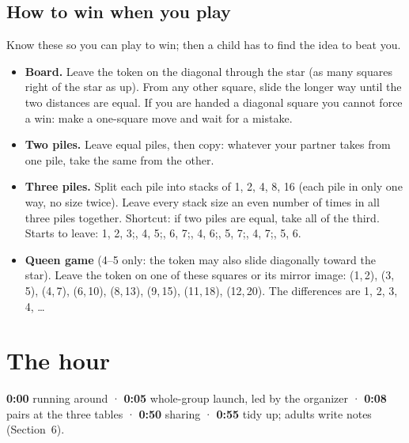 \documentclass[10pt]{article}
\begin{document}
\subsection{How to win when you play}
Know these so you can play to win; then a child has to find the idea to beat you.
\begin{itemize}
\item \textbf{Board.} Leave the token on the diagonal through the star (as many squares right of the star as up). From any other square, slide the longer way until the two distances are equal. If you are handed a diagonal square you cannot force a win: make a one-square move and wait for a mistake.
\item \textbf{Two piles.} Leave equal piles, then copy: whatever your partner takes from one pile, take the same from the other.
\item \textbf{Three piles.} Split each pile into stacks of 1, 2, 4, 8, 16 (each pile in only one way, no size twice). Leave every stack size an even number of times in all three piles together. Shortcut: if two piles are equal, take all of the third. Starts to leave: 1, 2, 3;, 4, 5;, 6, 7;, 4, 6;, 5, 7;, 4, 7;, 5, 6.
\item \textbf{Queen game} (4--5 only: the token may also slide diagonally toward the star). Leave the token on one of these squares or its mirror image: (1,\,2), (3,\,5), (4,\,7), (6,\,10), (8,\,13), (9,\,15), (11,\,18), (12,\,20). The differences are 1, 2, 3, 4, \dots
\end{itemize}

\section{The hour}\label{s3}

\textbf{0:00} running around \;·\; \textbf{0:05} whole-group launch, led by the organizer \;·\; \textbf{0:08} pairs at the three tables \;·\; \textbf{0:50} sharing \;·\; \textbf{0:55} tidy up; adults write notes (Section~6).
\end{document}
